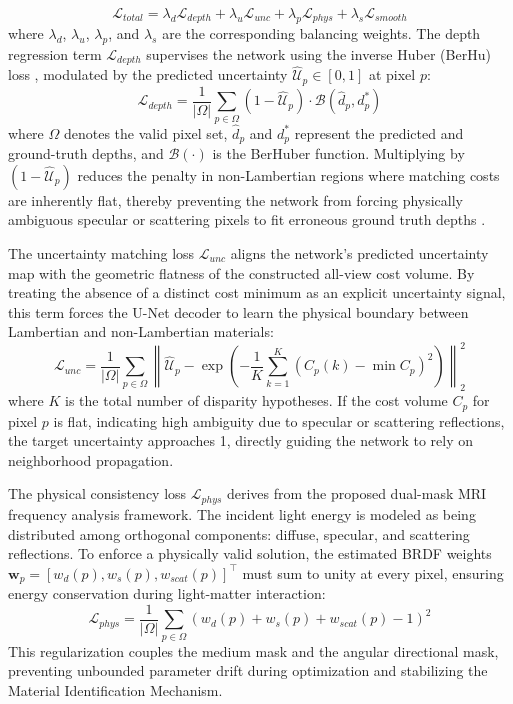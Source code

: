 \documentclass[lettersize,journal]{IEEEtran}
\begin{document}
\begin{equation}
\mathcal{L}_{total} = \lambda_{d} \mathcal{L}_{depth} + \lambda_{u} \mathcal{L}_{unc} + \lambda_{p} \mathcal{L}_{phys} + \lambda_{s} \mathcal{L}_{smooth}
\end{equation}
where $\lambda_{d}$, $\lambda_{u}$, $\lambda_{p}$, and $\lambda_{s}$ are the corresponding balancing weights. The depth regression term $\mathcal{L}_{depth}$ supervises the network using the inverse Huber (BerHu) loss \cite{eigen2014}, modulated by the predicted uncertainty $\hat{\mathcal{U}}_p \in [0,1]$ at pixel $p$:
\begin{equation}
\mathcal{L}_{depth} = \frac{1}{|\Omega|} \sum_{p \in \Omega} (1 - \hat{\mathcal{U}}_p) \cdot \mathcal{B}(\hat{d}_p, d^*_p)
\end{equation}
where $\Omega$ denotes the valid pixel set, $\hat{d}_p$ and $d^*_p$ represent the predicted and ground-truth depths, and $\mathcal{B}(\cdot)$ is the BerHuber function. Multiplying by $(1 - \hat{\mathcal{U}}_p)$ reduces the penalty in non-Lambertian regions where matching costs are inherently flat, thereby preventing the network from forcing physically ambiguous specular or scattering pixels to fit erroneous ground truth depths \cite{godard2019}.

The uncertainty matching loss $\mathcal{L}_{unc}$ aligns the network's predicted uncertainty map with the geometric flatness of the constructed all-view cost volume. By treating the absence of a distinct cost minimum as an explicit uncertainty signal, this term forces the U-Net decoder \cite{ronneberger2015} to learn the physical boundary between Lambertian and non-Lambertian materials:
\begin{equation}
\mathcal{L}_{unc} = \frac{1}{|\Omega|} \sum_{p \in \Omega} \left\| \hat{\mathcal{U}}_p - \exp\left( -\frac{1}{K} \sum_{k=1}^{K} (C_p(k) - \min C_p)^2 \right) \right\|_2^2
\end{equation}
where $K$ is the total number of disparity hypotheses. If the cost volume $C_p$ for pixel $p$ is flat, indicating high ambiguity due to specular or scattering reflections, the target uncertainty approaches 1, directly guiding the network to rely on neighborhood propagation.

The physical consistency loss $\mathcal{L}_{phys}$ derives from the proposed dual-mask MRI frequency analysis framework. The incident light energy is modeled as being distributed among orthogonal components: diffuse, specular, and scattering reflections. To enforce a physically valid solution, the estimated BRDF weights $\mathbf{w}_p = [w_d(p), w_s(p), w_{scat}(p)]^\top$ must sum to unity at every pixel, ensuring energy conservation during light-matter interaction:
\begin{equation}
\mathcal{L}_{phys} = \frac{1}{|\Omega|} \sum_{p \in \Omega} \left( w_d(p) + w_s(p) + w_{scat}(p) - 1 \right)^2
\end{equation}
This regularization couples the medium mask and the angular directional mask, preventing unbounded parameter drift during optimization and stabilizing the Material Identification Mechanism.
\end{document}
